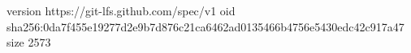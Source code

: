 version https://git-lfs.github.com/spec/v1
oid sha256:0da7f455e19277d2e9b7d876c21ca6462ad0135466b4756e5430edc42c917a47
size 2573
